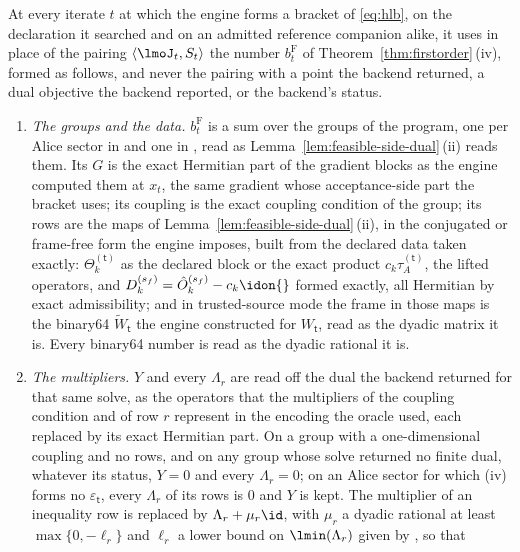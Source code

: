 \begin{requirement}\label{req:verified-feasible-side}
At every iterate $t$ at which the engine forms a bracket of \eqref{eq:hlb},
on the declaration it searched and on an admitted reference companion alike,
it uses in place of the pairing $\langle\lmoJ_t,S_t\rangle$ the number
$b^{\mathrm F}_t$ of Theorem~\ref{thm:firstorder}\,(iv), formed as follows,
and never the pairing with a point the backend returned, a dual objective
the backend reported, or the backend's status.
\begin{enumerate}[label=(\roman*),leftmargin=2.4em]
\item \emph{The groups and the data.} $b^{\mathrm F}_t$ is a sum over the
  groups of the program, one per Alice sector in 
  and one in , read as
  Lemma~\ref{lem:feasible-side-dual}\,(ii) reads them. Its $G$ is the exact
  Hermitian part of the gradient blocks as the engine computed them at
  $x_t$, the same gradient whose acceptance-side part the bracket uses; its
  coupling is the exact coupling condition of the group; its rows are the
  maps of Lemma~\ref{lem:feasible-side-dual}\,(ii), in the conjugated or
  frame-free form the engine imposes, built from the declared data taken
  exactly: $\Theta^{(\mathsf t)}_k$ as the declared block or the exact
  product $c_k\tau^{(\mathsf t)}_A$, the lifted operators, and
  $D^{(s_f)}_k=\hat O^{(s_f)}_k-c_k\idon{}$ formed exactly, all Hermitian by
  exact admissibility; and in trusted-source mode the frame in those maps is
  the binary64 $\widetilde W_{\mathsf t}$ the engine constructed for
  $W_{\mathsf t}$, read as the dyadic matrix it is. Every binary64 number is
  read as the dyadic rational it is.
\item \emph{The multipliers.} $Y$ and every $\Lambda_r$ are read off the
  dual the backend returned for that same solve, as the operators that the
  multipliers of the coupling condition and of row $r$ represent in the
  encoding the oracle used, each replaced by its exact Hermitian part. On a
  group with a one-dimensional coupling and no rows, and on any group whose
  solve returned no finite dual, whatever its status, $Y=0$ and every
  $\Lambda_r=0$; on an Alice sector for which (iv) forms no
  $\varepsilon_{\mathsf t}$, every $\Lambda_r$ of its rows is $0$ and $Y$ is
  kept. The multiplier of an inequality row is replaced by
  $\Lambda_r+\mu_r\id$, with $\mu_r$ a dyadic rational at least
  $\max\{0,-\ell_r\}$ and $\ell_r$ a lower bound on $\lmin(\Lambda_r)$ given
  by , so that

\end{enumerate}
\end{requirement}
